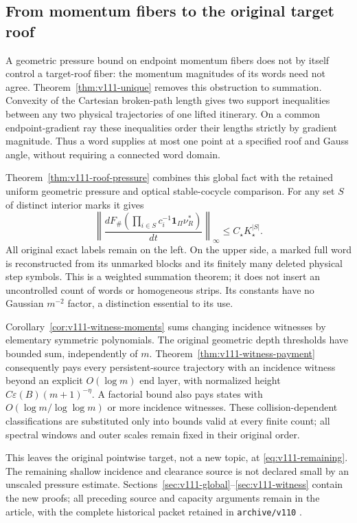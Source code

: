 \documentclass[11pt,reqno]{amsart}
\numberwithin{equation}{section}
\theoremstyle{definition}\newtheorem{definition}[theorem]{Definition}
\theoremstyle{remark}\newtheorem{remark}[theorem]{Remark}
\newcommand{\one}{\mathbf1}\newcommand{\dd}{\,\mathrm d}
\begin{document}
\subsection*{From momentum fibers to the original target roof}
A geometric pressure bound on endpoint momentum fibers does not by
itself control a target-roof fiber: the momentum magnitudes of its
words need not agree. Theorem~\ref{thm:v111-unique} removes this
obstruction to summation. Convexity of the Cartesian broken-path
length gives two support inequalities between any two physical
trajectories of one lifted itinerary. On a common endpoint-gradient
ray these inequalities order their lengths strictly by gradient
magnitude. Thus a word supplies at most one point at a specified
roof and Gauss angle, without requiring a connected word domain.

Theorem~\ref{thm:v111-roof-pressure} combines this global fact with
the retained uniform geometric pressure and optical stable-cocycle
comparison. For any set $S$ of distinct interior marks it gives
\[
 \left\|\frac{dF_\#(\prod_{i\in S}c_i^{-1}\one_\Pi\nu_R^*)}{dt}
             \right\|_\infty\le C_\star K_\star^{|S|}.
\]
All original exact labels remain on the left. On the upper side,
a marked full word is reconstructed from its unmarked blocks and
its finitely many deleted physical step symbols. This is a weighted
summation theorem; it does not insert an uncontrolled count of words
or homogeneous strips. Its constants have no Gaussian $m^{-2}$
factor, a distinction essential to its use.

Corollary~\ref{cor:v111-witness-moments} sums changing incidence
witnesses by elementary symmetric polynomials. The original geometric
depth thresholds have bounded sum, independently of $m$.
Theorem~\ref{thm:v111-witness-payment} consequently pays every
persistent-source trajectory with an incidence witness beyond an
explicit $O(\log m)$ end layer, with normalized height
$C\varepsilon(B)(m+1)^{-\eta}$. A factorial bound also pays states
with $O(\log m/\log\log m)$ or more incidence witnesses. These
collision-dependent classifications are substituted only into bounds
valid at every finite count; all spectral windows and outer scales
remain fixed in their original order.

This leaves the original pointwise target, not a new topic, at
\eqref{eq:v111-remaining}. The remaining shallow incidence and
clearance source is not declared small by an unscaled pressure
estimate. Sections~\ref{sec:v111-global}--\ref{sec:v111-witness}
contain the new proofs; all preceding source and capacity arguments
remain in the article, with the complete historical packet retained
in \texttt{archive/v110} \cite{Q110}.
\end{document}
